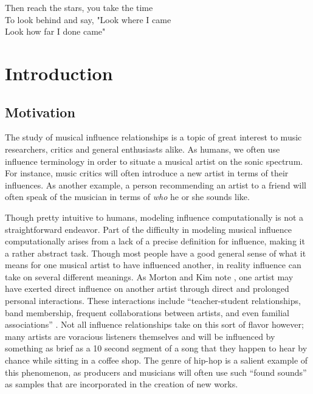 \begin{savequote}[75mm] 
Then reach the stars, you take the time\\
To look behind and say, "Look where I came\\
Look how far I done came"
\end{savequote}

\chapter{Introduction}

\section{Motivation}
The study of musical influence relationships is a topic of great interest to music researchers, critics and general enthusiasts alike. As humans, we often use influence terminology in order to situate a musical artist on the sonic spectrum. For instance, music critics will often introduce a new artist in terms of their influences. As another example, a person recommending an artist to a friend will often speak of the musician in terms of \textit{who} he or she sounds like. 

Though pretty intuitive to humans, modeling influence computationally is not a straightforward endeavor. Part of the difficulty in modeling musical influence computationally arises from a lack of a precise definition for influence, making it a rather abstract task. Though most people have a good general sense of what it means for one musical artist to have influenced another, in reality influence can take on several different meanings. As Morton and Kim note \cite{morton2015acoustic}, one artist may have exerted direct influence on another artist through direct and prolonged personal interactions. These interactions include ``teacher-student relationships, band membership, frequent collaborations between artists, and even familial associations'' \cite{morton2015acoustic}. Not all influence relationships take on this sort of flavor however; many artists are voracious listeners themselves and will be influenced by something as brief as a 10 second segment of a song that they happen to hear by chance while sitting in a coffee shop. The genre of hip-hop is a salient example of this phenomenon, as producers and musicians will often use such ``found sounds'' as samples that are incorporated in the creation of new works. 

